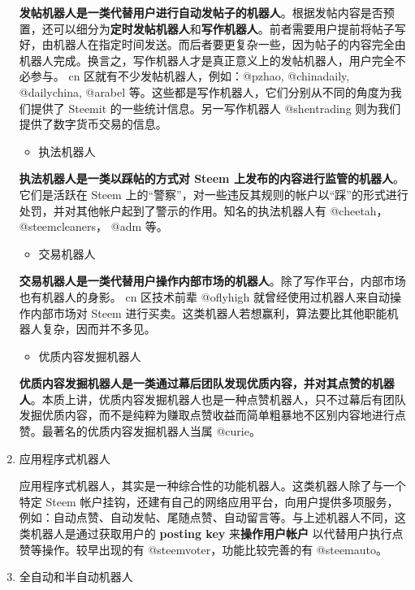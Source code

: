 \documentclass[]{ctexbook}
\providecommand{\tightlist}{%
  \setlength{\itemsep}{0pt}\setlength{\parskip}{0pt}}
\begin{document}
\begin{enumerate}
  \textbf{发帖机器人是一类代替用户进行自动发帖子的机器人}。根据发帖内容是否预置，还可以细分为\textbf{定时发帖机器人}和\textbf{写作机器人}。前者需要用户提前将帖子写好，由机器人在指定时间发送。而后者要更复杂一些，因为帖子的内容完全由机器人完成。换言之，写作机器人才是真正意义上的发帖机器人，用户完全不必参与。 cn 区就有不少发帖机器人，例如：@pzhao, @chinadaily, @dailychina, @arabel 等。这些都是写作机器人，它们分别从不同的角度为我们提供了 Steemit 的一些统计信息。另一写作机器人 @shentrading 则为我们提供了数字货币交易的信息。

  \begin{itemize}
  \tightlist
  \item
    执法机器人
  \end{itemize}

  \textbf{执法机器人是一类以踩帖的方式对 Steem 上发布的内容进行监管的机器人}。它们是活跃在 Steem 上的``警察''，对一些违反其规则的帐户以``踩''的形式进行处罚，并对其他帐户起到了警示的作用。知名的执法机器人有 @cheetah， @steemcleaners， @adm 等。

  \begin{itemize}
  \tightlist
  \item
    交易机器人
  \end{itemize}

  \textbf{交易机器人是一类代替用户操作内部市场的机器人}。除了写作平台，内部市场也有机器人的身影。 cn 区技术前辈 @oflyhigh 就曾经使用过机器人来自动操作内部市场对 Steem 进行买卖。这类机器人若想赢利，算法要比其他职能机器人复杂，因而并不多见。

  \begin{itemize}
  \tightlist
  \item
    优质内容发掘机器人
  \end{itemize}

  \textbf{优质内容发掘机器人是一类通过幕后团队发现优质内容，并对其点赞的机器人}。本质上讲，优质内容发掘机器人也是一种点赞机器人，只不过幕后有团队发掘优质内容，而不是纯粹为赚取点赞收益而简单粗暴地不区别内容地进行点赞。最著名的优质内容发掘机器人当属 @curie。
\item
  应用程序式机器人

  应用程序式机器人，其实是一种综合性的功能机器人。这类机器人除了与一个特定 Steem 帐户挂钩，还建有自己的网络应用平台，向用户提供多项服务，例如：自动点赞、自动发帖、尾随点赞、自动留言等。与上述机器人不同，这类机器人是通过获取用户的 \textbf{posting key} 来\textbf{操作用户帐户} 以代替用户执行点赞等操作。较早出现的有 @steemvoter，功能比较完善的有 @steemauto。
\item
  全自动和半自动机器人


\end{enumerate}
\end{document}
